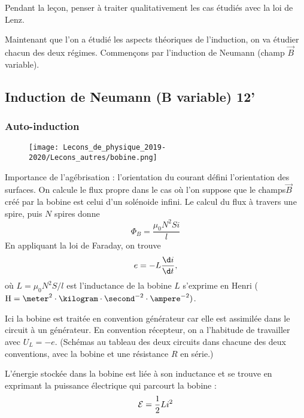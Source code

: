 Pendant la leçon, penser à traiter qualitativement les cas étudiés avec la loi de Lenz.

\begin{transition}
Maintenant que l'on a étudié les aspects théoriques de l'induction, on va étudier chacun des deux régimes.
Commençons par l'induction de Neumann (champ $\overrightarrow{B}$ variable).
\end{transition}

\subsection{Induction de Neumann (B variable) 12'}

\subsubsection{Auto-induction}

\begin{figure}[!h]
\center
\texttt{[image: Lecons\_de\_physique\_2019-2020/Lecons\_autres/bobine.png]}
\end{figure}

Importance de l'agébrisation : l'orientation du courant défini l'orientation des surfaces.
On calcule le flux propre dans le cas où l'on suppose que le champs$\overrightarrow{B}$ créé par la bobine est celui d'un solénoide infini.
Le calcul du flux à travers une spire, puis $N$ spires donne
\begin{equation}
\Phi_B = \frac{\mu_0 N^2 S i}{l}
\end{equation}
En appliquant la loi de Faraday, on trouve
\begin{equation}
e = -L\frac{\d i}{\d t},
\end{equation}
où $L = \mu_0 N^2 S/l$ est l'inductance de la bobine  
$L$ s'exprime en Henri ($\mathrm{H}=\meter^2\cdot\kilogram\cdot\second^{-2}\cdot\ampere^{-2})$.

Ici la bobine est traitée en convention générateur car elle est assimilée dans le circuit à un générateur.
En convention récepteur, on a l'habitude de travailler avec $U_L = -e$.
(Schémas au tableau des deux circuits dans chacune des deux conventions, avec la bobine et une résistance $R$ en série.)

L'énergie stockée dans la bobine est liée à son inductance et se trouve en exprimant la puissance électrique qui parcourt la bobine :
\begin{equation}
{\cal{E}} = \frac{1}{2}Li^2
\end{equation}

